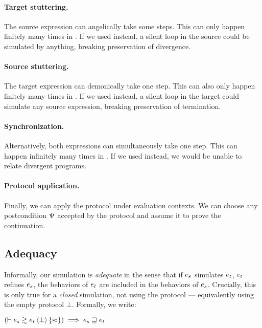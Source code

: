 \paragraph{ Target stuttering.}
The source expression can angelically take some steps.
This can only happen finitely many times in \iSimLfp.
If we used \iSimGfp instead, a silent loop in the source could be simulated by anything, breaking preservation of divergence.

\paragraph{ Source stuttering.}
The target expression can demonically take one step.
This can also only happen finitely many times in \iSimLfp.
If we used \iSimGfp instead, a silent loop in the target could simulate any source expression, breaking preservation of termination.

\paragraph{ Synchronization.}
Alternatively, both expressions can simultaneously take one step.
This can happen infinitely many times in \iSimGfp.
If we used \iSimLfp instead, we would be unable to relate divergent programs.

\paragraph{ Protocol application.}
Finally, we can apply the protocol under evaluation contexts.
We can choose any postcondition $\Psi$ accepted by the protocol and assume it to prove the continuation.

\subsection{Adequacy}



Informally, our simulation is \emph{adequate} in the sense that if $\datalangExpr_s$ simulates $\datalangExpr_t$, $\datalangExpr_t$ refines $\datalangExpr_s$, \ie the behaviors of $\datalangExpr_t$ are included in the behaviors of $\datalangExpr_s$.
Crucially, this is only true for a \emph{closed} simulation, \ie not using the protocol --- equivalently using the empty protocol $\bot$.
Formally, we write:

\begin{lemma} \label{thm:adequacy}
    $
        \left( \vdash \iSimv[\bot]{\iSimilar}{\datalangExpr_s}{\datalangExpr_t} \right) \implies
        \datalangExpr_s \refined \datalangExpr_t
    $
\end{lemma}

